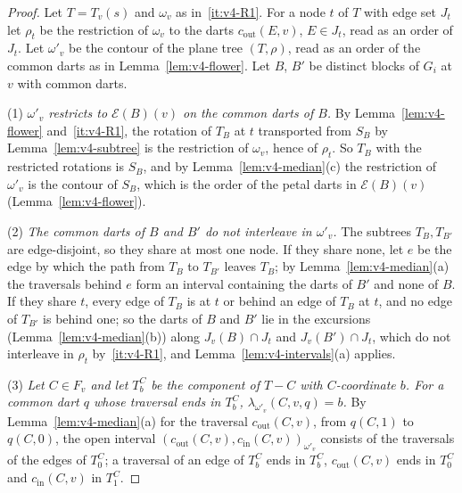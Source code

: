 \begin{proof}
Let $T=T_v(s)$ and $\omega_v$ as in~\ref{it:v4-R1}. For a node $t$ of $T$
with edge set $J_t$ let $\rho_t$ be the restriction of $\omega_v$ to the
darts $c_{\mathrm{out}}(E,v)$, $E\in J_t$, read as an order of $J_t$. Let
$\omega'_v$ be the contour of the plane tree $(T,\rho)$, read as an order of
the common darts as in Lemma~\ref{lem:v4-flower}. Let $B$, $B'$ be distinct
blocks of $G_i$ at $v$ with common darts.

(1) \emph{$\omega'_v$ restricts to $\mathcal E(B)(v)$ on the common darts of
$B$.} By Lemma~\ref{lem:v4-flower} and~\ref{it:v4-R1}, the rotation of
$T_B$ at $t$ transported from $S_B$ by Lemma~\ref{lem:v4-subtree} is the
restriction of $\omega_v$, hence of $\rho_t$. So $T_B$ with the restricted
rotations is $S_B$, and by Lemma~\ref{lem:v4-median}(c) the restriction of
$\omega'_v$ is the contour of $S_B$, which is the order of the petal darts
in $\mathcal E(B)(v)$ (Lemma~\ref{lem:v4-flower}).

(2) \emph{The common darts of $B$ and $B'$ do not interleave in $\omega'_v$.}
The subtrees $T_B,T_{B'}$ are edge-disjoint, so they share at most one node.
If they share none, let $e$ be the edge by which the path from $T_B$ to
$T_{B'}$ leaves $T_B$; by Lemma~\ref{lem:v4-median}(a) the traversals behind
$e$ form an interval containing the darts of $B'$ and none of $B$. If they
share $t$, every edge of $T_B$ is at $t$ or behind an edge of $T_B$ at $t$,
and no edge of $T_{B'}$ is behind one; so the darts of $B$ and $B'$ lie in
the excursions (Lemma~\ref{lem:v4-median}(b)) along $J_v(B)\cap J_t$ and
$J_v(B')\cap J_t$, which do not interleave in $\rho_t$ by~\ref{it:v4-R1}, and
Lemma~\ref{lem:v4-intervals}(a) applies.

(3) \emph{Let $C\in F_v$ and let $T^C_b$ be the component of $T-C$ with
$C$-coordinate $b$. For a common dart $q$ whose traversal ends in $T^C_b$,
$\lambda_{\omega'_v}(C,v,q)=b$.} By Lemma~\ref{lem:v4-median}(a) for the
traversal $c_{\mathrm{out}}(C,v)$, from $q(C,1)$ to $q(C,0)$, the open
interval $(c_{\mathrm{out}}(C,v),c_{\mathrm{in}}(C,v))_{\omega'_v}$ consists
of the traversals of the edges of $T^C_0$; a traversal of an edge of $T^C_b$
ends in $T^C_b$, $c_{\mathrm{out}}(C,v)$ ends in $T^C_0$ and
$c_{\mathrm{in}}(C,v)$ in $T^C_1$.


\end{proof}
